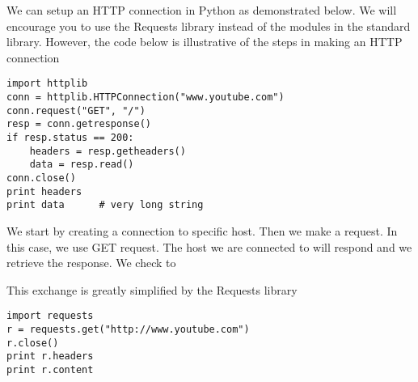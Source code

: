 We can setup an HTTP connection in Python as demonstrated below.
We will encourage you to use the Requests library instead of the modules in the standard library.
However, the code below is illustrative of the steps in making an HTTP connection
\begin{lstlisting}
import httplib
conn = httplib.HTTPConnection("www.youtube.com")
conn.request("GET", "/")
resp = conn.getresponse()
if resp.status == 200:
    headers = resp.getheaders()
    data = resp.read()
conn.close()
print headers
print data      # very long string
\end{lstlisting}
We start by creating a connection to specific host.
Then we make a request.  In this case, we use GET request.
The host we are connected to will respond and we retrieve the response.
We check to 

This exchange is greatly simplified by the Requests library
\begin{lstlisting}
import requests
r = requests.get("http://www.youtube.com")
r.close()
print r.headers
print r.content
\end{lstlisting}

